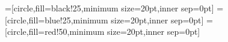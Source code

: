 

=[circle,fill=black!25,minimum size=20pt,inner sep=0pt]
=[circle,fill=blue!25,minimum size=20pt,inner sep=0pt]
=[circle,fill=red!50,minimum size=20pt,inner sep=0pt]

	

